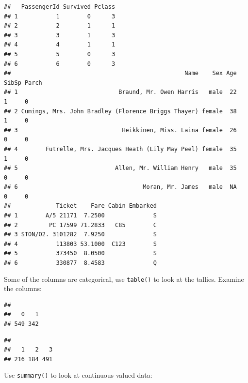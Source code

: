 \documentclass[
]{book}
\newenvironment{Shaded}{\begin{snugshade}}{\end{snugshade}}
\newcommand{\FunctionTok}[1]{\textcolor[rgb]{0.13,0.29,0.53}{\textbf{#1}}}
\newcommand{\NormalTok}[1]{#1}
\newcommand{\SpecialCharTok}[1]{\textcolor[rgb]{0.81,0.36,0.00}{\textbf{#1}}}
\begin{document}
\begin{verbatim}
##   PassengerId Survived Pclass
## 1           1        0      3
## 2           2        1      1
## 3           3        1      3
## 4           4        1      1
## 5           5        0      3
## 6           6        0      3
##                                                  Name    Sex Age SibSp Parch
## 1                             Braund, Mr. Owen Harris   male  22     1     0
## 2 Cumings, Mrs. John Bradley (Florence Briggs Thayer) female  38     1     0
## 3                              Heikkinen, Miss. Laina female  26     0     0
## 4        Futrelle, Mrs. Jacques Heath (Lily May Peel) female  35     1     0
## 5                            Allen, Mr. William Henry   male  35     0     0
## 6                                    Moran, Mr. James   male  NA     0     0
##             Ticket    Fare Cabin Embarked
## 1        A/5 21171  7.2500              S
## 2         PC 17599 71.2833   C85        C
## 3 STON/O2. 3101282  7.9250              S
## 4           113803 53.1000  C123        S
## 5           373450  8.0500              S
## 6           330877  8.4583              Q
\end{verbatim}

Some of the columns are categorical, use \texttt{table()} to look at the tallies. Examine the columns:

\begin{Shaded}
\end{Shaded}

\begin{verbatim}
## 
##   0   1 
## 549 342
\end{verbatim}

\begin{Shaded}
\end{Shaded}

\begin{verbatim}
## 
##   1   2   3 
## 216 184 491
\end{verbatim}

Use \texttt{summary()} to look at continuous-valued data:

\begin{Shaded}
\end{Shaded}
\end{document}

